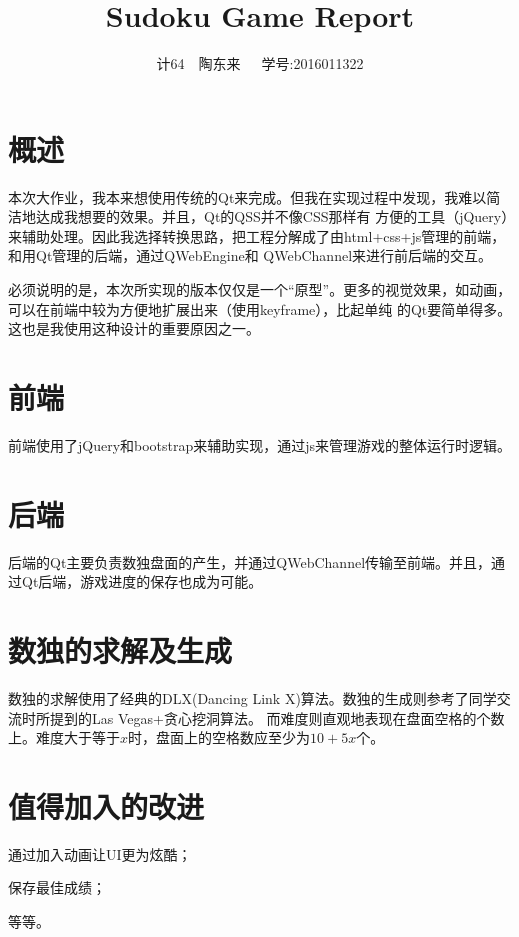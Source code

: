 \documentclass[a4paper,10pt]{article}
\title{Sudoku Game Report}
\author{计64~~陶东来~~~学号:2016011322}
\begin{document}
    \maketitle
    \section{概述}

    本次大作业，我本来想使用传统的Qt来完成。但我在实现过程中发现，我难以简洁地达成我想要的效果。并且，Qt的QSS并不像CSS那样有
    方便的工具（jQuery）来辅助处理。因此我选择转换思路，把工程分解成了由html+css+js管理的前端，和用Qt管理的后端，通过QWebEngine和
    QWebChannel来进行前后端的交互。

    必须说明的是，本次所实现的版本仅仅是一个“原型”。更多的视觉效果，如动画，可以在前端中较为方便地扩展出来（使用keyframe），比起单纯
    的Qt要简单得多。这也是我使用这种设计的重要原因之一。

    \section{前端}

    前端使用了jQuery和bootstrap来辅助实现，通过js来管理游戏的整体运行时逻辑。

    \section{后端}

    后端的Qt主要负责数独盘面的产生，并通过QWebChannel传输至前端。并且，通过Qt后端，游戏进度的保存也成为可能。

    \section{数独的求解及生成}

    数独的求解使用了经典的DLX(Dancing Link X)算法。数独的生成则参考了同学交流时所提到的Las Vegas+贪心挖洞算法。
    而难度则直观地表现在盘面空格的个数上。难度大于等于$x$时，盘面上的空格数应至少为$10+5x$个。

    \section{值得加入的改进}

    通过加入动画让UI更为炫酷；

    保存最佳成绩；

    等等。
\end{document}
